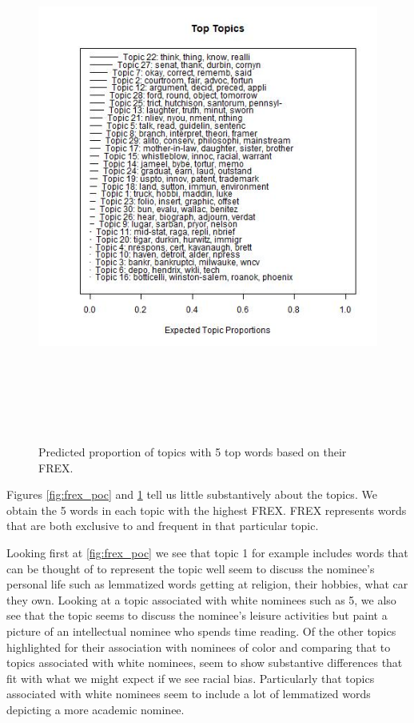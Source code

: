 \documentclass [12pt]{article}
\begin{document}
\begin{figure}[H]
    \centering
    \includegraphics[height = 175mm, width = 175mm]{../tables_figures/stm_male_frex.jpg}
    \caption{Predicted proportion of topics with 5 top words based on their FREX.}
    \label{fig:frex_male}
\end{figure}
	    
Figures \ref{fig:frex_poc} and \ref{fig:frex_male} tell us little substantively about the topics. We obtain the 5 words in each topic with the highest FREX. FREX represents words that are both exclusive to and frequent in that particular topic.

Looking first at \ref{fig:frex_poc} we see that topic 1 for example includes words that can be thought of to represent the topic well seem to discuss the nominee's personal life such as lemmatized words getting at religion, their hobbies, what car they own. Looking at a topic associated with white nominees such as 5, we also see that the topic seems to discuss the nominee's leisure activities but paint a picture of an intellectual nominee who spends time reading. Of the other topics highlighted for their association with nominees of color and comparing that to topics associated with white nominees, seem to show substantive differences that fit with what we might expect if we see racial bias. Particularly that topics associated with white nominees seem to include a lot of lemmatized words depicting a more academic nominee.
\end{document}
